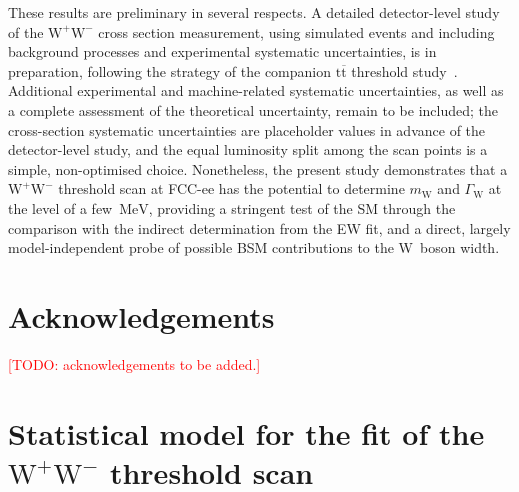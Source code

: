 \documentclass[a4paper,11pt]{article}
\newcommand{\ttbar}{\ensuremath{\mathrm{t\overline{t}}}\xspace}
\newcommand{\WW}{\ensuremath{\mathrm{W^+W^-}}\xspace}
\newcommand{\mW}{\ensuremath{m_\mathrm{W}}\xspace}
\newcommand{\GW}{\ensuremath{\Gamma_\mathrm{W}}\xspace}
\newcommand{\MeV}{\ensuremath{\,\mathrm{MeV}}\xspace}
\newcommand{\TODO}[1]{\textcolor{red}{[TODO: #1]}\xspace}
\begin{document}
These results are preliminary in several respects. A detailed
detector-level study of the \WW cross section measurement, using
simulated events and including background processes and experimental
systematic uncertainties, is in preparation, following the strategy of
the companion \ttbar threshold study~\cite{Defranchis:2025hfh}.
Additional experimental and machine-related systematic uncertainties, as
well as a complete assessment of the theoretical uncertainty, remain to
be included; the cross-section systematic uncertainties are placeholder
values in advance of the detector-level study, and the equal luminosity
split among the scan points is a simple, non-optimised choice.
Nonetheless, the present study demonstrates
that a \WW threshold scan at FCC-ee has the potential to determine \mW
and \GW at the level of a few \MeV, providing a stringent test of the SM
through the comparison with the indirect determination from the EW fit,
and a direct, largely model-independent probe of possible BSM
contributions to the W~boson width.


\section*{Acknowledgements}
\TODO{acknowledgements to be added.}





\clearpage
\appendix

\section{Statistical model for the fit of the \boldmath \texorpdfstring{\WW}{W+W-} threshold scan}
\label{app:fit_model}
\end{document}

